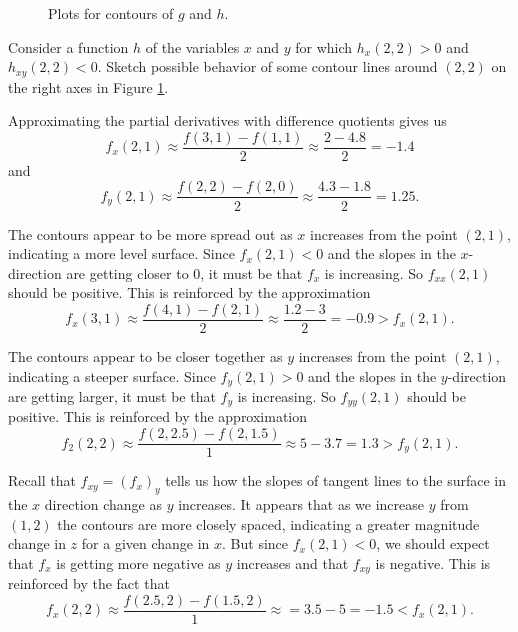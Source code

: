 \begin{exercises}
\begin{figure}[ht]
\begin{center}
    \end{center}
    \caption{Plots for contours of $g$ and $h$.}
    \label{F:10.3.activity.grad}
  \end{figure}
\item Consider a function $h$ of the variables $x$ and $y$ for which $h_x(2,2) > 0$ and
  $h_{xy}(2,2) < 0$.  Sketch possible behavior of some contour
  lines around $(2,2)$ on the right axes in Figure \ref{F:10.3.activity.grad}.

\ea

\begin{exerciseSolution}
\ba
\item Approximating the partial derivatives with difference quotients gives us
\[f_x(2,1) \approx \frac{f(3,1)-f(1,1)}{2} \approx \frac{2-4.8}{2} = -1.4\]
and
\[f_y(2,1) \approx \frac{f(2,2)-f(2,0)}{2} \approx \frac{4.3-1.8}{2} = 1.25.\] 
\item The contours appear to be more spread out as $x$ increases from the point $(2,1)$, indicating a more level surface. Since $f_x(2,1) < 0$ and the slopes in the $x$-direction are getting closer to 0, it must be that $f_{x}$ is increasing. So $f_{xx}(2,1)$ should be positive. This is reinforced by the approximation 
\[f_x(3,1) \approx \frac{f(4,1)-f(2,1)}{2} \approx \frac{1.2-3}{2} = -0.9 > f_x(2,1).\]
\item The contours appear to be closer together as $y$ increases from the point $(2,1)$, indicating a steeper surface. Since $f_y(2,1) > 0$ and the slopes in the $y$-direction are getting larger, it must be that $f_{y}$ is increasing. So $f_{yy}(2,1)$ should be positive. This is reinforced by the approximation
\[f_2(2,2) \approx \frac{f(2,2.5)-f(2,1.5)}{1} \approx 5-3.7 = 1.3 > f_y(2,1).\]
\item Recall that $f_{xy} = (f_x)_y$ tells us how the slopes of tangent lines to the surface in the $x$ direction change as $y$ increases. It appears that as we increase $y$ from $(1,2)$ the contours are more closely spaced, indicating a greater magnitude change in $z$ for a given change in $x$. But since $f_x(2,1) < 0$, we should expect that $f_{x}$ is getting more negative as $y$ increases and that $f_{xy}$ is negative. This is reinforced by the fact that 
\[f_x(2,2) \approx \frac{f(2.5,2)-f(1.5,2)}{1} \approx  = 3.5-5 = -1.5 < f_x(2,1).\]


\end{exerciseSolution}
\end{exercises}
